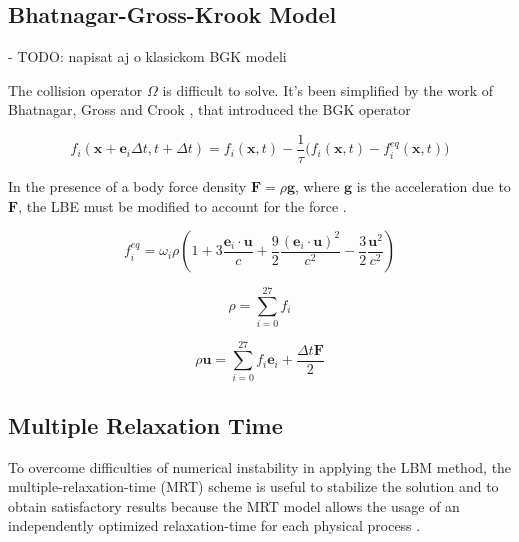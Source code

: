 \subsection{Bhatnagar-Gross-Krook Model}


- TODO: napisat aj o klasickom BGK modeli \citep{bhatnagarModelCollisionProcesses1954}

The collision operator $\Omega$ is difficult to solve. It's been simplified by the work of Bhatnagar, Gross and Crook \cite{bhatnagarModelCollisionProcesses1954}, that introduced the BGK operator

\begin{equation}
	\label{eq:std-bgk}
	f_i (\bm{x}+\bm{e}_i\Delta t,t+\Delta t) = f_i (\bm{x},t)-\frac{1}{\tau}\Big(f_i (\bm{x},t) - f_i^{eq} (\bm{x},t)\Big)
\end{equation}

In the presence of a body force density $\bm{F} = \rho \bm{g}$, where $\bm{g}$ is
the acceleration due to $\bm{F}$, the LBE must be modified to account for the force \cite{guoDiscreteLatticeEffects2002}.

\begin{equation}
	\label{eq:feq}
	f_i^{eq} = \omega_i \rho \left( 1+3\frac{\bm{e}_i \cdot \bm{u}}{c} + \frac{9}{2}\frac{(\bm{e}_i \cdot \bm{u})^2}{c^2}-\frac{3}{2}\frac{\bm{u}^2}{c^2}\right)
\end{equation}

\begin{equation}
	\label{eq:density}
	\rho = \sum_{i=0}^{27}f_i
\end{equation}

\begin{equation}
	\label{eq:velocity}
	\rho\bm{u} = \sum_{i=0}^{27} f_i \bm{e}_i + \frac{\Delta t \bm{F}}{2}
\end{equation}

\subsection{Multiple Relaxation Time}

To overcome difficulties of numerical instability in applying the LBM method, the multiple-relaxation-time (MRT) scheme is useful to stabilize the solution and to obtain satisfactory results because the MRT model allows the usage of an independently optimized relaxation-time for each physical process \cite{sugaD3Q27MultiplerelaxationtimeLattice2015}.

